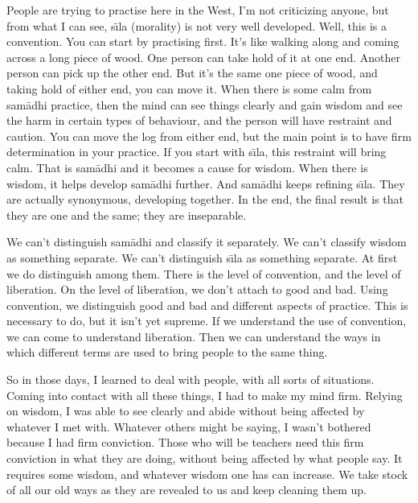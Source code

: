 People are trying to practise here in the West, I'm not criticizing anyone, but from what I can see, s\={\i}la (morality) is not very well developed. Well, this is a convention. You can start by practising  first. It's like walking along and coming across a long piece of wood. One person can take hold of it at one end. Another person can pick up the other end. But it's the same one piece of wood, and taking hold of either end, you can move it. When there is some calm from sam\=adhi practice, then the mind can see things clearly and gain wisdom and see the harm in certain types of behaviour, and the person will have restraint and caution. You can move the log from either end, but the main point is to have firm determination in your practice. If you start with s\={\i}la, this restraint will bring calm. That is sam\=adhi and it becomes a cause for wisdom. When there is wisdom, it helps develop sam\=adhi further. And sam\=adhi keeps refining s\={\i}la. They are actually synonymous, developing together. In the end, the final result is that they are one and the same; they are inseparable.

We can't distinguish sam\=adhi and classify it separately. We can't classify wisdom as something separate. We can't distinguish s\={\i}la as something separate. At first we do distinguish among them. There is the level of convention, and the level of liberation. On the level of liberation, we don't attach to good and bad. Using convention, we distinguish good and bad and different aspects of practice. This is necessary to do, but it isn't yet supreme. If we understand the use of convention, we can come to understand liberation. Then we can understand the ways in which different terms are used to bring people to the same thing.

So in those days, I learned to deal with people, with all sorts of situations. Coming into contact with all these things, I had to make my mind firm. Relying on wisdom, I was able to see clearly and abide without being affected by whatever I met with. Whatever others might be saying, I wasn't bothered because I had firm conviction. Those who will be teachers need this firm conviction in what they are doing, without being affected by what people say. It requires some wisdom, and whatever wisdom one has can increase. We take stock of all our old ways as they are revealed to us and keep cleaning them up.

